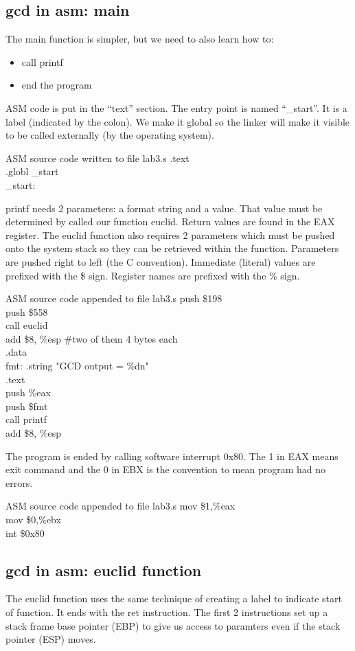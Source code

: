 \documentclass{article}
\begin{document}
\clearpage\subsection{gcd in asm: main}
%
The main function is simpler, but we need to also learn how to: 
\begin{itemize}
\item call printf
\item end the program
\end{itemize}
ASM code is put in the ``text'' section. The entry point is named ``_start''. It is a label (indicated by the colon). We make it global so the linker will make it visible to be called externally (by the operating system).
\begin{GFT}{ASM source code written to file lab3.s}
\+.text\\
\+.globl \_start\\
\+\_start:\\
\end{GFT}
\clearpage
printf needs 2 parameters: a format string and a value. That value must be determined by called our function euclid. Return values are found in the EAX register. The euclid function also requires 2 parameters which must be pushed onto the system stack so they can be retrieved within the function. Parameters are pushed right to left (the C convention). Immediate (literal) values are prefixed with the \$ sign. Register names are prefixed with the \% sign.
\begin{GFT}{ASM source code appended to file lab3.s}
\+push \$198\\
\+push \$558\\
\+call euclid\\
\+add \$8, \%esp \#two of them 4 bytes each\\
\+.data\\
\+fmt: .string "GCD output = \%d\Backslash{}n"\\
\+.text\\
\+push \%eax\\
\+push \$fmt\\
\+call printf\\
\+add \$8, \%esp\\
\end{GFT}
\clearpage
The program is ended by calling software interrupt 0x80. The 1 in EAX means exit command and the 0 in EBX is the convention to mean program had no errors.
\begin{GFT}{ASM source code appended to file lab3.s}
\+mov \$1,\%eax\\
\+mov \$0,\%ebx\\
\+int \$0x80\\
\end{GFT}
\clearpage\subsection{gcd in asm: euclid function}
The euclid function uses the same technique of creating a label to indicate start of function. It ends with the ret instruction. The first 2 instructions set up a stack frame base pointer (EBP) to give us access to paramters even if the stack pointer (ESP) moves.
\end{document}
